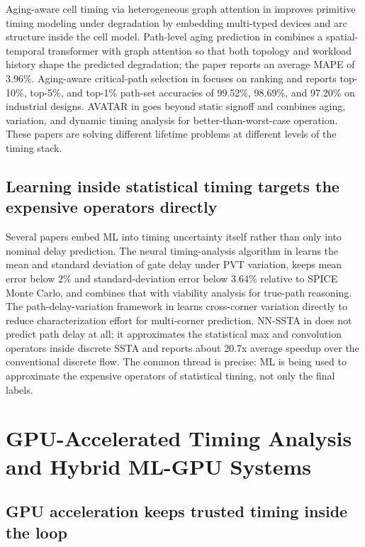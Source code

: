 \documentclass[num-refs]{wiley-article}
\begin{document}
  Aging-aware cell timing via heterogeneous graph attention in \cite{ref14} improves primitive timing modeling under degradation by embedding multi-typed devices and arc structure inside the cell model. Path-level aging prediction in \cite{ref15} combines a spatial-temporal transformer with graph attention so that both topology and workload history shape the predicted degradation; the paper reports an average MAPE of 3.96\%. Aging-aware critical-path selection in \cite{ref23} focuses on ranking and reports top-10\%, top-5\%, and top-1\% path-set accuracies of 99.52\%, 98.69\%, and 97.20\% on industrial designs. AVATAR in \cite{ref26} goes beyond static signoff and combines aging, variation, and dynamic timing analysis for better-than-worst-case operation. These papers are solving different lifetime problems at different levels of the timing stack.


  \subsection{Learning inside statistical timing targets the expensive operators directly}

  Several papers embed ML into timing uncertainty itself rather than only into nominal delay prediction. The neural timing-analysis algorithm in \cite{ref30} learns the mean and standard deviation of gate delay under PVT variation, keeps mean error below 2\% and standard-deviation error below 3.64\% relative to SPICE Monte Carlo, and combines that with viability analysis for true-path reasoning. The path-delay-variation framework in \cite{ref33} learns cross-corner variation directly to reduce characterization effort for multi-corner prediction. NN-SSTA in \cite{ref34} does not predict path delay at all; it approximates the statistical max and convolution operators inside discrete SSTA and reports about 20.7x average speedup over the conventional discrete flow. The common thread is precise: ML is being used to approximate the expensive operators of statistical timing, not only the final labels.


  \section{GPU-Accelerated Timing Analysis and Hybrid ML-GPU Systems}

  \subsection{GPU acceleration keeps trusted timing inside the loop}
\end{document}
